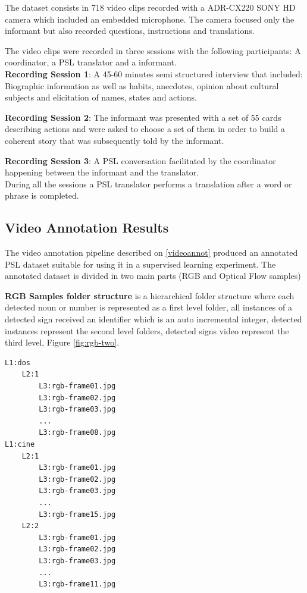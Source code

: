 \documentclass[twocolumn,conference]{article}
\begin{document}
The dataset consists in 718 video clips recorded with a ADR-CX220 SONY HD camera which included an embedded microphone. The camera focused only the informant but also recorded questions, instructions and translations.

The video clips were recorded in three sessions with the following participants: A coordinator, a PSL \cite{lsp_2015} translator and a informant.\\

\textbf{Recording Session 1}: A 45-60 minutes semi structured interview that included: Biographic information as well as habits, anecdotes, opinion about cultural subjects and elicitation of names, states and actions. 

\textbf{Recording Session 2}: The informant was presented with a set of 55 cards describing actions and were asked to choose a set of them in order to build a coherent story that was subsequently told by the informant.

\textbf{Recording Session 3}: A PSL \cite{lsp_2015} conversation facilitated by the coordinator happening between the informant and the translator.\\

During all the sessions a PSL \cite{lsp_2015} translator performs a translation after a word or phrase is completed.

\subsection{Video Annotation Results}\label{video-annotation-results}
The video annotation pipeline described on \ref{videoannot} produced an annotated PSL dataset suitable for using it in a supervised learning experiment. The annotated dataset is divided in two main parts (RGB and Optical Flow samples)

\textbf{RGB Samples folder structure} is a hierarchical folder structure where each detected noun or number is represented as a first level folder, all instances of a detected sign received an identifier which is an auto incremental integer, detected instances represent the second level folders, detected signs video represent the third level, Figure \ref{fig:rgb-two}.
\begin{lstlisting}[caption=RGB Samples Folder Structure example, basicstyle=\ttfamily\small]
L1:dos
	L2:1
		L3:rgb-frame01.jpg
		L3:rgb-frame02.jpg
		L3:rgb-frame03.jpg
		...
		L3:rgb-frame08.jpg
L1:cine
	L2:1
		L3:rgb-frame01.jpg
		L3:rgb-frame02.jpg
		L3:rgb-frame03.jpg
		...
		L3:rgb-frame15.jpg
	L2:2
		L3:rgb-frame01.jpg
		L3:rgb-frame02.jpg
		L3:rgb-frame03.jpg
		...
		L3:rgb-frame11.jpg
\end{lstlisting}\label{list:rgb-samples-folders}
\end{document}
